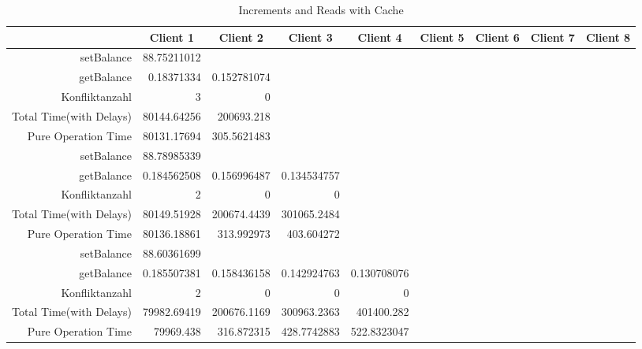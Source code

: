\begin{landscape}
\begin{table}[htbp]
\scriptsize
  \centering
  \caption{Increments and Reads with Cache}
    \begin{tabular}{rrrrrrrrr}
    \toprule
          & \multicolumn{1}{c}{Client 1} & \multicolumn{1}{c}{Client 2} & \multicolumn{1}{c}{Client 3} & \multicolumn{1}{c}{Client 4} & \multicolumn{1}{c}{Client 5} & \multicolumn{1}{c}{Client 6} & \multicolumn{1}{c}{Client 7} & \multicolumn{1}{c}{Client 8} \\
    \midrule
    setBalance & 88.75211012 &       &       &       &       &       &       &  \\
    getBalance & 0.18371334 & 0.152781074 &       &       &       &       &       &  \\
    Konfliktanzahl & 3     & 0     &       &       &       &       &       &  \\
    Total Time(with Delays) & 80144.64256 & 200693.218 &       &       &       &       &       &  \\
    Pure Operation Time & 80131.17694 & 305.5621483 &       &       &       &       &       &  \\
\cline{1-9}    
    setBalance & 88.78985339 &       &       &       &       &       &       &  \\
    getBalance & 0.184562508 & 0.156996487 & 0.134534757 &       &       &       &       &  \\
    Konfliktanzahl & 2     & 0     & 0     &       &       &       &       &  \\
    Total Time(with Delays) & 80149.51928 & 200674.4439 & 301065.2484 &       &       &       &       &  \\
    Pure Operation Time & 80136.18861 & 313.992973 & 403.604272 &       &       &       &       &  \\
\cline{1-9}    
    setBalance & 88.60361699 &       &       &       &       &       &       &  \\
    getBalance & 0.185507381 & 0.158436158 & 0.142924763 & 0.130708076 &       &       &       &  \\
    Konfliktanzahl & 2     & 0     & 0     & 0     &       &       &       &  \\
    Total Time(with Delays) & 79982.69419 & 200676.1169 & 300963.2363 & 401400.282 &       &       &       &  \\
    Pure Operation Time & 79969.438 & 316.872315 & 428.7742883 & 522.8323047 &       &       &       &  \\ 

\end{tabular}
\end{table}
\end{landscape}
